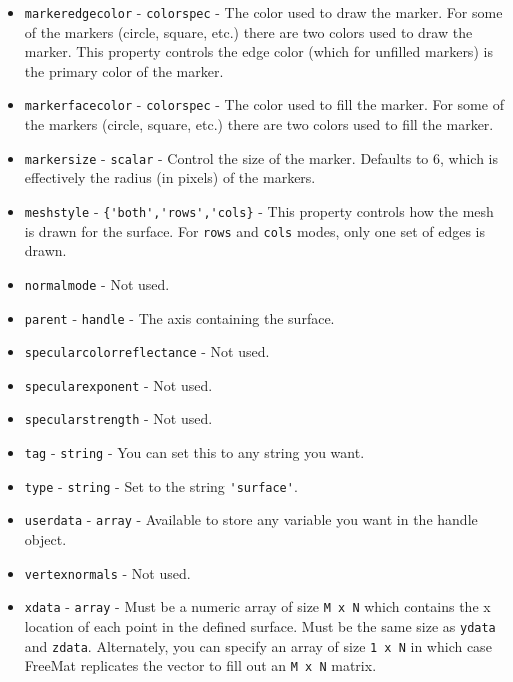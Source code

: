 \begin{itemize}
\item  \verb|markeredgecolor| - \verb|colorspec| - The color used to draw the marker.  For some
 of the markers (circle, square, etc.) there are two colors used to draw the marker.
 This property controls the edge color (which for unfilled markers) is the primary
 color of the marker.

\item  \verb|markerfacecolor| - \verb|colorspec| - The color used to fill the marker.  For some
 of the markers (circle, square, etc.) there are two colors used to fill the marker.

\item  \verb|markersize| - \verb|scalar| - Control the size of the marker.  Defaults to 6, which
 is effectively the radius (in pixels) of the markers.

\item  \verb|meshstyle| - \verb|{'both','rows','cols}| - This property controls how the mesh is
 drawn for the surface.  For \verb|rows| and \verb|cols| modes, only one set of edges is drawn.

\item  \verb|normalmode| - Not used.

\item  \verb|parent| - \verb|handle| - The axis containing the surface.

\item  \verb|specularcolorreflectance| - Not used.

\item  \verb|specularexponent| - Not used.

\item  \verb|specularstrength| - Not used.

\item  \verb|tag| - \verb|string| - You can set this to any string you want.

\item  \verb|type| - \verb|string| - Set to the string \verb|'surface'|.

\item  \verb|userdata| - \verb|array| - Available to store any variable you
 want in the handle object.

\item  \verb|vertexnormals| - Not used.

\item  \verb|xdata| - \verb|array| - Must be a numeric array of size \verb|M x N| which contains
 the x location of each point in the defined surface. Must be the same size as \verb|ydata|
 and \verb|zdata|.  Alternately, you can specify an array of size \verb|1 x N| in which case
 FreeMat replicates the vector to fill out an \verb|M x N| matrix.


\end{itemize}
